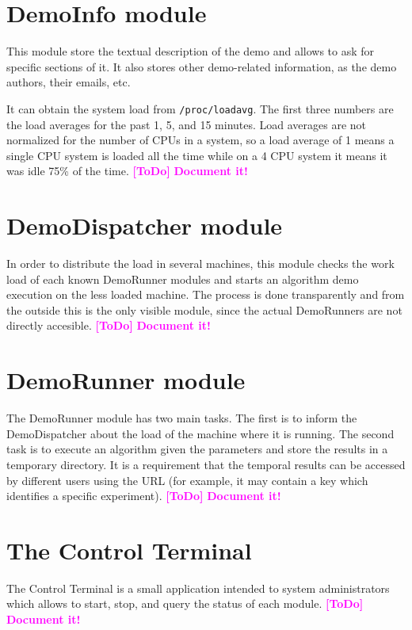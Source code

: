 \documentclass[a4paper,12pt]{article}
\newcommand{\ToDo}[1]{\textcolor{magenta}{\textbf{[ToDo]} \textbf{#1}}}
\begin{document}






\section{DemoInfo module}
This module store the textual description of the demo and allows to ask for specific sections of it. It also stores other demo-related information, as the demo authors, their emails, etc.

It can obtain the system load from {\tt /proc/loadavg}. The first three numbers are the load averages for the past 1, 5, and 15 minutes. Load averages are not normalized for the number of CPUs in a system, so a load  average  of 1 means a single CPU system is loaded all the time while on a 4 CPU system it means it was idle 75\% of the time.
\ToDo{Document it!}

\section{DemoDispatcher module}
In order to distribute the load in several machines, this module checks the work load of each known DemoRunner modules and starts an algorithm demo execution on the less loaded machine. The process is done transparently and from the outside this is the only visible module, since the actual DemoRunners are not directly accesible.
\ToDo{Document it!}

\section{DemoRunner module}
The DemoRunner module has two main tasks. The first is to inform the DemoDispatcher about the load of the machine where it is running. The second task is to execute an algorithm given the parameters and store the results in a temporary directory. It is a requirement that the temporal results can be accessed by different users using the URL (for example, it may contain a key which identifies a specific experiment).
\ToDo{Document it!}

\section{The Control Terminal}
The Control Terminal is a small application intended to system administrators which allows to start, stop, and query the status of each module.
\ToDo{Document it!}
\end{document}
